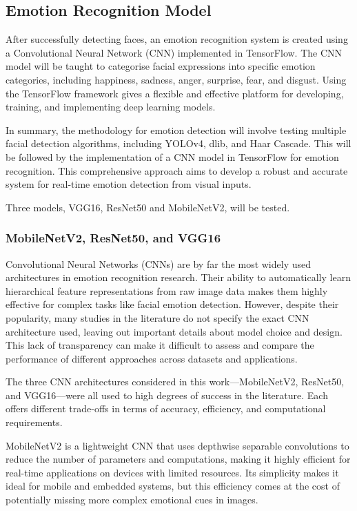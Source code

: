 \subsection{Emotion Recognition Model}

After successfully detecting faces, an emotion recognition system is created using a Convolutional Neural Network (CNN) implemented in TensorFlow. The CNN model will be taught to categorise facial expressions into specific emotion categories, including happiness, sadness, anger, surprise, fear, and disgust. Using the TensorFlow framework gives a flexible and effective platform for developing, training, and implementing deep learning models.

In summary, the methodology for emotion detection will involve testing multiple facial detection algorithms, including YOLOv4, dlib, and Haar Cascade. This will be followed by the implementation of a CNN model in TensorFlow for emotion recognition. This comprehensive approach aims to develop a robust and accurate system for real-time emotion detection from visual inputs.

Three models, VGG16, ResNet50 and MobileNetV2, will be tested.

\subsubsection{MobileNetV2, ResNet50, and VGG16}

Convolutional Neural Networks (CNNs) are by far the most widely used architectures in emotion recognition research. Their ability to automatically learn hierarchical feature representations from raw image data makes them highly effective for complex tasks like facial emotion detection. However, despite their popularity, many studies in the literature do not specify the exact CNN architecture used, leaving out important details about model choice and design. This lack of transparency can make it difficult to assess and compare the performance of different approaches across datasets and applications.

The three CNN architectures considered in this work—MobileNetV2, ResNet50, and VGG16—were all used to high degrees of success in the literature. Each offers different trade-offs in terms of accuracy, efficiency, and computational requirements.

MobileNetV2 is a lightweight CNN that uses depthwise separable convolutions to reduce the number of parameters and computations, making it highly efficient for real-time applications on devices with limited resources. Its simplicity makes it ideal for mobile and embedded systems, but this efficiency comes at the cost of potentially missing more complex emotional cues in images.

